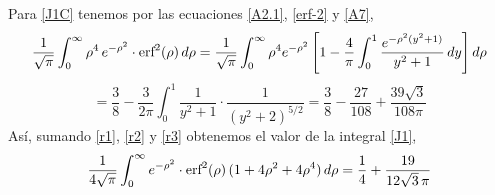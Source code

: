 \documentclass[12pt]{book}
\numberwithin{equation}{chapter}
\def\r{\rho}
\def\erf{\hbox{erf}}
\begin{document}
Para \eqref{J1C} tenemos por las ecuaciones \eqref{A2.1}, \eqref{erf-2} y \eqref{A7},
$$ \frac{1}{\sqrt{\pi}} \int_{0}^{\infty} \r^{4} \,e^{-\r^{2}}\cdot \erf^{2}(\r)\, d\r =\frac{1}{\sqrt{\pi}} \int_{0}^{\infty}\r^{4} e^{-\r^{2}} \left[1-\frac{4}{\pi} \int_{0}^{1} \frac{e^{-\r^{2}(y^{2}+1)}}{y^{2}+1}\, dy \right]  d\r  $$
\begin{equation}\label{r3}
= \frac{3}{8} -\frac{3}{2\pi} \int_{0}^{1} \frac{1}{y^{2}+1}\cdot \frac{1}{(y^{2}+2)^{5/2}} = \frac{3}{8} - \frac{27}{108} + \frac{39 \sqrt{3}}{108 \pi}
\end{equation}
As\'i, sumando \eqref{r1}, \eqref{r2} y \eqref{r3} obtenemos el valor de la integral \eqref{J1},
\begin{equation}\label{Jr1}
\frac{1}{4\sqrt{\pi}} \int_{0}^{\infty} e^{-\r^{2}}\cdot \erf^{2}(\r)\, ( 1+4\r^{2}+4\r^{4} )\, d\r= \frac{1}{4} + \frac{19}{12 \sqrt{3}\, \pi} 
\end{equation}

\newpage
\end{document}
